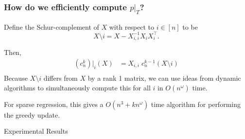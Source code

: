 \documentclass{beamer}
\begin{document}
\begin{frame}
    \frametitle{How do we efficiently compute $p|_T$?}
    Define the Schur-complement of $X$ with respect to $i \in [n]$ to be
    \[
        X \setminus i = X - X_{i,i}^{-1} X_{i} X_{i}^{\intercal}.
    \]

    Then,
    \begin{align*} 
        (c_n^k)|_i(X)&=X_{i,i} \; c_n^{k-1}(X \setminus i)\\
    \end{align*}
    Because $X \setminus i$ differs from $X$ by a rank 1 matrix, we can use ideas from dynamic algorithms to simultaneously compute this for all $i$ in $O(n^{\omega})$ time.

    For sparse regression, this gives a $O(n^3+kn^{\omega})$ time algorithm for performing the greedy update.
\end{frame}
\begin{frame}
    \centering
    \huge
    {\color{gray}Experimental Results}
\end{frame}
\end{document}
